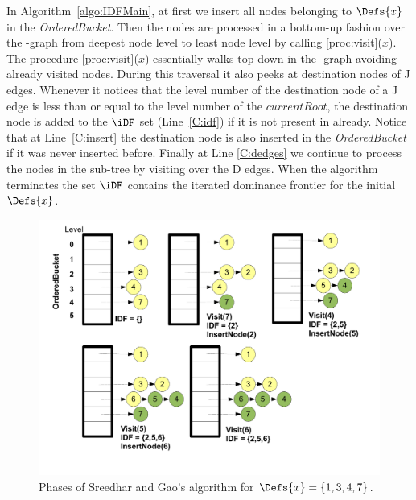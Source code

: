 {In Algorithm~\ref{algo:IDFMain}, at first we insert all nodes belonging to $\Defs{x}$ in the 
\textit{OrderedBucket}. Then the nodes are processed
in a bottom-up fashion over the \DJ-graph from deepest node level to least node level
by calling \ref{proc:visit}($x$). The procedure \ref{proc:visit}($x$) essentially 
walks top-down in the  \DJ-graph avoiding already visited nodes. During this 
traversal it also peeks at destination nodes of J edges. Whenever it notices 
that the level number of the destination node of a J edge is less than or equal 
to the level number of the $\textit{currentRoot}$, the destination node is 
added to the $\iDF$ set (Line~\ref{C:idf}) if it is not present in \iDF already. 
Notice that at Line~\ref{C:insert} the destination node is also inserted in the 
{\it OrderedBucket} if it was never inserted before. Finally at Line 
\ref{C:dedges} we continue to process the nodes in the sub-tree by visiting 
over the D edges. When the algorithm terminates the 
set $\iDF$ contains the iterated dominance frontier for the initial $\Defs{x}$.

    \begin{figure}[htb]
    \centerline{\includegraphics[scale=0.3]{sreedhargao.pdf}}
    \caption{Phases of Sreedhar and Gao's algorithm for $\Defs{x}=\{1,3,4,7\}$.}
    \label{fig:sreedhargao}
    \end{figure} 

}
